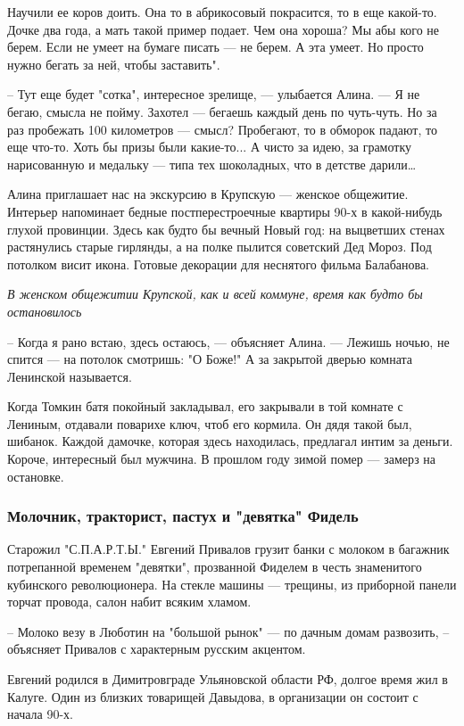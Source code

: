 Научили ее коров доить. Она то в абрикосовый покрасится, то в еще какой-то.
Дочке два года, а мать такой пример подает. Чем она хороша? Мы абы кого не
берем. Если не умеет на бумаге писать --- не берем. А эта умеет. Но просто нужно
бегать за ней, чтобы заставить".

– Тут еще будет "сотка", интересное зрелище, --- улыбается Алина. --- Я не бегаю,
смысла не пойму. Захотел --- бегаешь каждый день по чуть-чуть. Но за раз
пробежать 100 километров --- смысл? Пробегают, то в обморок падают, то еще
что-то. Хоть бы призы были какие-то... А чисто за идею, за грамотку
нарисованную и медальку --- типа тех шоколадных, что в детстве дарили…

Алина приглашает нас на экскурсию в Крупскую --- женское общежитие. Интерьер
напоминает бедные постперестроечные квартиры 90-х в какой-нибудь глухой
провинции. Здесь как будто бы вечный Новый год: на выцветших стенах растянулись
старые гирлянды, а на полке пылится советский Дед Мороз. Под потолком висит
икона. Готовые декорации для неснятого фильма Балабанова.

\emph{В женском общежитии Крупской, как и всей коммуне, время как будто бы остановилось}

– Когда я рано встаю, здесь остаюсь, --- объясняет Алина. --- Лежишь ночью, не
спится --- на потолок смотришь: "О Боже!" А за закрытой дверью комната Ленинской
называется. 

Когда Томкин батя покойный закладывал, его закрывали в той комнате с Лениным,
отдавали поварихе ключ, чтоб его кормила. Он дядя такой был, шибанок. Каждой
дамочке, которая здесь находилась, предлагал интим за деньги. Короче,
интересный был мужчина. В прошлом году зимой помер --- замерз на остановке. 

\subsubsection{Молочник, тракторист, пастух и "девятка" Фидель}

Старожил "С.П.А.Р.Т.Ы." Евгений Привалов грузит банки с молоком в багажник
потрепанной временем "девятки", прозванной Фиделем в честь знаменитого
кубинского революционера. На стекле машины --- трещины, из приборной панели
торчат провода, салон набит всяким хламом.

– Молоко везу в Люботин на "большой рынок" --- по дачным домам развозить, –
объясняет Привалов с характерным русским акцентом.

Евгений родился в Димитровграде Ульяновской области РФ, долгое время жил в
Калуге. Один из близких товарищей Давыдова, в организации он состоит с начала
90-х. 

